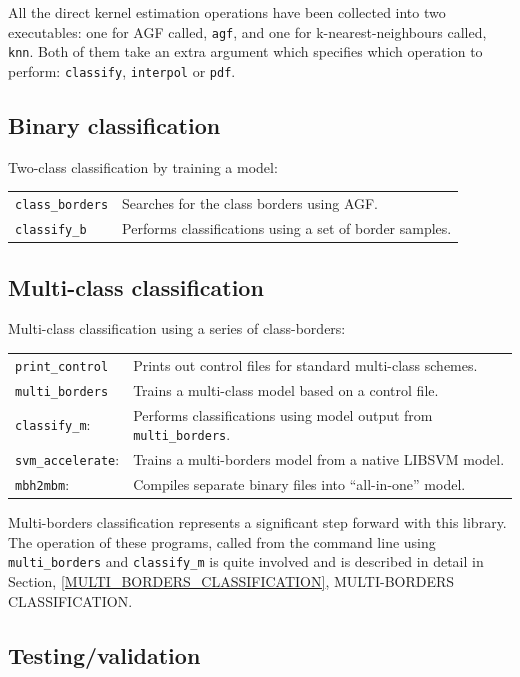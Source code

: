 \documentclass[12pt]{article}
\begin{document}
  All the direct kernel estimation operations have been collected into two executables: one for AGF called, \verb"agf", and one for k-nearest-neighbours called, \verb"knn".  Both of them take an extra argument which specifies which operation to perform: \verb"classify", \verb"interpol" or \verb"pdf".

\subsection{Binary classification}

Two-class classification by training a model:

\begin{tabular}{ll}
\verb/class_borders/ & Searches for the class borders using AGF.\\
\verb/classify_b/ & Performs classifications using a set of border samples.
\end{tabular}

\subsection{Multi-class classification}

Multi-class classification using a series of class-borders:

\begin{tabular}{ll}
\verb/print_control/ & 	Prints out control files for standard multi-class schemes.\\
\verb/multi_borders/ & 	Trains a multi-class model based on a control file.\\
\verb/classify_m/: & Performs classifications using model output from \verb/multi_borders/.\\
\verb/svm_accelerate/: & Trains a multi-borders model from a native LIBSVM model.\\
	\verb/mbh2mbm/: & Compiles separate binary files into ``all-in-one'' model. \\
\end{tabular}

  Multi-borders classification represents a significant step forward with this library.  The operation of these programs, called from the command line using \verb/multi_borders/ and \verb/classify_m/ is quite involved and is described in detail in Section, \ref{MULTI_BORDERS_CLASSIFICATION}, MULTI-BORDERS CLASSIFICATION.

\subsection{Testing/validation}
\end{document}
